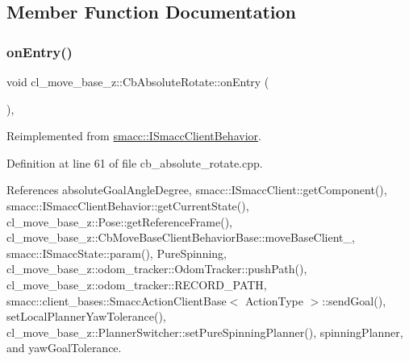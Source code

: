 \subsection{Member Function Documentation}
\mbox{\label{classcl__move__base__z_1_1CbAbsoluteRotate_a10418ea360809fa649d295716b152b2b}} 
\subsubsection{\texorpdfstring{on\+Entry()}{onEntry()}}
{\footnotesize\ttfamily void cl\+\_\+move\+\_\+base\+\_\+z\+::\+Cb\+Absolute\+Rotate\+::on\+Entry (\begin{DoxyParamCaption}{ }\end{DoxyParamCaption})\hspace{0.3cm}{\ttfamily [override]}, {\ttfamily [virtual]}}



Reimplemented from \hyperlink{classsmacc_1_1ISmaccClientBehavior_a3ec24a839087c550e1d62a81e48cf530}{smacc\+::\+I\+Smacc\+Client\+Behavior}.



Definition at line 61 of file cb\+\_\+absolute\+\_\+rotate.\+cpp.



References absolute\+Goal\+Angle\+Degree, smacc\+::\+I\+Smacc\+Client\+::get\+Component(), smacc\+::\+I\+Smacc\+Client\+Behavior\+::get\+Current\+State(), cl\+\_\+move\+\_\+base\+\_\+z\+::\+Pose\+::get\+Reference\+Frame(), cl\+\_\+move\+\_\+base\+\_\+z\+::\+Cb\+Move\+Base\+Client\+Behavior\+Base\+::move\+Base\+Client\+\_\+, smacc\+::\+I\+Smacc\+State\+::param(), Pure\+Spinning, cl\+\_\+move\+\_\+base\+\_\+z\+::odom\+\_\+tracker\+::\+Odom\+Tracker\+::push\+Path(), cl\+\_\+move\+\_\+base\+\_\+z\+::odom\+\_\+tracker\+::\+R\+E\+C\+O\+R\+D\+\_\+\+P\+A\+TH, smacc\+::client\+\_\+bases\+::\+Smacc\+Action\+Client\+Base$<$ Action\+Type $>$\+::send\+Goal(), set\+Local\+Planner\+Yaw\+Tolerance(), cl\+\_\+move\+\_\+base\+\_\+z\+::\+Planner\+Switcher\+::set\+Pure\+Spinning\+Planner(), spinning\+Planner, and yaw\+Goal\+Tolerance.


